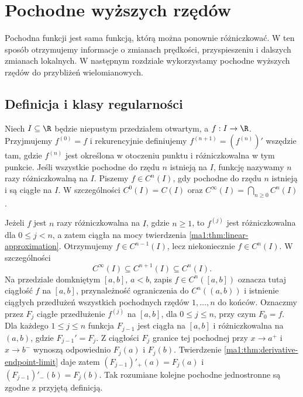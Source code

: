 \chapter{Pochodne wyższych rzędów}
\label{ma1:ch:higher-derivatives}

Pochodna funkcji jest sama funkcją, którą można ponownie różniczkować. W ten sposób otrzymujemy informacje o zmianach prędkości, przyspieszeniu i dalszych zmianach lokalnych. W następnym rozdziale wykorzystamy pochodne wyższych rzędów do przybliżeń wielomianowych.

\section{Definicja i klasy regularności}
\begin{definicja}
\label{ma1:def:higher-derivatives}
Niech $I\subseteq\R$ będzie niepustym przedziałem otwartym, a $f:I\to\R$. Przyjmujemy $f^{(0)}=f$ i rekurencyjnie definiujemy $f^{(n+1)}=(f^{(n)})'$ wszędzie tam, gdzie $f^{(n)}$ jest określona w otoczeniu punktu i różniczkowalna w tym punkcie. Jeśli wszystkie pochodne do rzędu $n$ istnieją na $I$, funkcję nazywamy $n$ razy różniczkowalną na $I$. Piszemy $f\in C^n(I)$, gdy pochodne do rzędu $n$ istnieją i są ciągłe na $I$. W szczególności $C^0(I)=C(I)$ oraz $C^\infty(I)=\bigcap_{n\ge0} C^n(I)$.
\end{definicja}
Jeżeli $f$ jest $n$ razy różniczkowalna na $I$, gdzie $n\ge1$, to $f^{(j)}$ jest różniczkowalna dla $0\le j<n$, a zatem ciągła na mocy twierdzenia \ref{ma1:thm:linear-approximation}. Otrzymujemy $f\in C^{n-1}(I)$, lecz niekoniecznie $f\in C^n(I)$. W szczególności
\[
 C^\infty(I)\subseteq C^{n+1}(I)\subseteq C^n(I).
\]
Na przedziale domkniętym $[a,b]$, $a<b$, zapis $f\in C^n([a,b])$ oznacza tutaj ciągłość $f$ na $[a,b]$, przynależność ograniczenia do $C^n((a,b))$ i istnienie ciągłych przedłużeń wszystkich pochodnych rzędów $1,\ldots,n$ do końców. Oznaczmy przez $F_j$ ciągłe przedłużenie $f^{(j)}$ na $[a,b]$, dla $0\le j\le n$, przy czym $F_0=f$. Dla każdego $1\le j\le n$ funkcja $F_{j-1}$ jest ciągła na $[a,b]$ i różniczkowalna na $(a,b)$, gdzie $F_{j-1}'=F_j$. Z ciągłości $F_j$ granice tej pochodnej przy $x\to a^+$ i $x\to b^-$ wynoszą odpowiednio $F_j(a)$ i $F_j(b)$. Twierdzenie \ref{ma1:thm:derivative-endpoint-limit} daje zatem $(F_{j-1})'_+(a)=F_j(a)$ i $(F_{j-1})'_-(b)=F_j(b)$. Tak rozumiane kolejne pochodne jednostronne są zgodne z przyjętą definicją.

